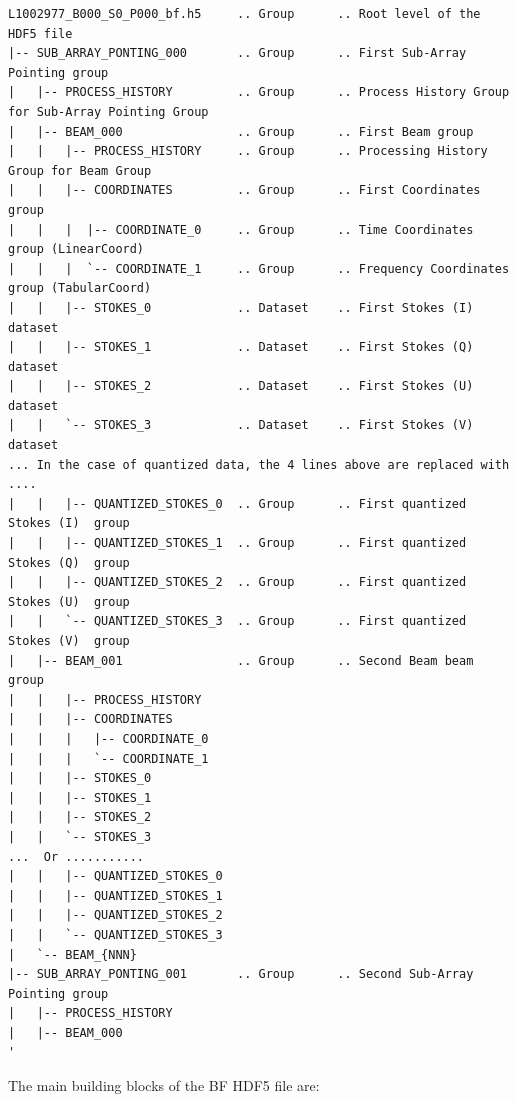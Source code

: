 \documentclass[a4paper,10pt,bibtotoc]{scrartcl}
\begin{document}
\begin{lstlisting}
L1002977_B000_S0_P000_bf.h5     .. Group      .. Root level of the HDF5 file
|-- SUB_ARRAY_PONTING_000       .. Group      .. First Sub-Array Pointing group
|   |-- PROCESS_HISTORY         .. Group      .. Process History Group for Sub-Array Pointing Group
|   |-- BEAM_000                .. Group      .. First Beam group
|   |   |-- PROCESS_HISTORY     .. Group      .. Processing History Group for Beam Group
|   |   |-- COORDINATES         .. Group      .. First Coordinates group
|   |   |  |-- COORDINATE_0     .. Group      .. Time Coordinates group (LinearCoord)
|   |   |  `-- COORDINATE_1     .. Group      .. Frequency Coordinates group (TabularCoord)
|   |   |-- STOKES_0            .. Dataset    .. First Stokes (I) dataset
|   |   |-- STOKES_1            .. Dataset    .. First Stokes (Q) dataset
|   |   |-- STOKES_2            .. Dataset    .. First Stokes (U) dataset
|   |   `-- STOKES_3            .. Dataset    .. First Stokes (V) dataset
... In the case of quantized data, the 4 lines above are replaced with ....
|   |   |-- QUANTIZED_STOKES_0  .. Group      .. First quantized Stokes (I)  group
|   |   |-- QUANTIZED_STOKES_1  .. Group      .. First quantized Stokes (Q)  group
|   |   |-- QUANTIZED_STOKES_2  .. Group      .. First quantized Stokes (U)  group
|   |   `-- QUANTIZED_STOKES_3  .. Group      .. First quantized Stokes (V)  group
|   |-- BEAM_001                .. Group      .. Second Beam beam group
|   |   |-- PROCESS_HISTORY
|   |   |-- COORDINATES
|   |   |   |-- COORDINATE_0
|   |   |   `-- COORDINATE_1
|   |   |-- STOKES_0
|   |   |-- STOKES_1
|   |   |-- STOKES_2
|   |   `-- STOKES_3
...  Or ...........
|   |   |-- QUANTIZED_STOKES_0
|   |   |-- QUANTIZED_STOKES_1
|   |   |-- QUANTIZED_STOKES_2
|   |   `-- QUANTIZED_STOKES_3
|   `-- BEAM_{NNN}
|-- SUB_ARRAY_PONTING_001       .. Group      .. Second Sub-Array Pointing group
|   |-- PROCESS_HISTORY
|   |-- BEAM_000
'
\end{lstlisting}

The main building blocks of the BF HDF5 file are:
\end{document}
